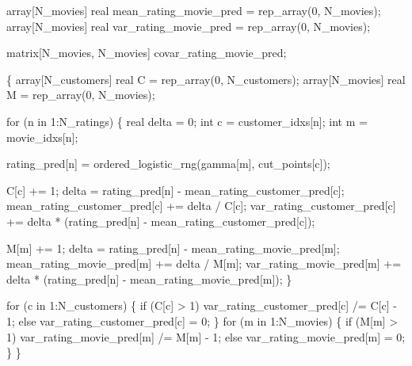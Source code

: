 \documentclass[
  letterpaper,
  DIV=11,
  numbers=noendperiod]{scrartcl}
\newenvironment{Shaded}{\begin{snugshade}}{\end{snugshade}}
\newcommand{\ControlFlowTok}[1]{\textcolor[rgb]{0.00,0.23,0.31}{#1}}
\newcommand{\DataTypeTok}[1]{\textcolor[rgb]{0.68,0.00,0.00}{#1}}
\newcommand{\DecValTok}[1]{\textcolor[rgb]{0.68,0.00,0.00}{#1}}
\newcommand{\NormalTok}[1]{\textcolor[rgb]{0.00,0.23,0.31}{#1}}
\begin{document}
\begin{codelisting}
\begin{Shaded}
\begin{Highlighting}[]
  \DataTypeTok{array}\NormalTok{[N\_movies] }\DataTypeTok{real}\NormalTok{ mean\_rating\_movie\_pred = rep\_array(}\DecValTok{0}\NormalTok{, N\_movies);}
  \DataTypeTok{array}\NormalTok{[N\_movies] }\DataTypeTok{real}\NormalTok{ var\_rating\_movie\_pred = rep\_array(}\DecValTok{0}\NormalTok{, N\_movies);}

  \DataTypeTok{matrix}\NormalTok{[N\_movies, N\_movies] covar\_rating\_movie\_pred;}

\NormalTok{  \{}
    \DataTypeTok{array}\NormalTok{[N\_customers] }\DataTypeTok{real}\NormalTok{ C = rep\_array(}\DecValTok{0}\NormalTok{, N\_customers);}
    \DataTypeTok{array}\NormalTok{[N\_movies] }\DataTypeTok{real}\NormalTok{ M = rep\_array(}\DecValTok{0}\NormalTok{, N\_movies);}

    \ControlFlowTok{for}\NormalTok{ (n }\ControlFlowTok{in} \DecValTok{1}\NormalTok{:N\_ratings) \{}
      \DataTypeTok{real}\NormalTok{ delta = }\DecValTok{0}\NormalTok{;}
      \DataTypeTok{int}\NormalTok{ c = customer\_idxs[n];}
      \DataTypeTok{int}\NormalTok{ m = movie\_idxs[n];}

\NormalTok{      rating\_pred[n] = ordered\_logistic\_rng(gamma[m], cut\_points[c]);}

\NormalTok{      C[c] += }\DecValTok{1}\NormalTok{;}
\NormalTok{      delta = rating\_pred[n] {-} mean\_rating\_customer\_pred[c];}
\NormalTok{      mean\_rating\_customer\_pred[c] += delta / C[c];}
\NormalTok{      var\_rating\_customer\_pred[c]}
\NormalTok{        += delta * (rating\_pred[n] {-} mean\_rating\_customer\_pred[c]);}

\NormalTok{      M[m] += }\DecValTok{1}\NormalTok{;}
\NormalTok{      delta = rating\_pred[n] {-} mean\_rating\_movie\_pred[m];}
\NormalTok{      mean\_rating\_movie\_pred[m] += delta / M[m];}
\NormalTok{      var\_rating\_movie\_pred[m]}
\NormalTok{        += delta * (rating\_pred[n] {-} mean\_rating\_movie\_pred[m]);}
\NormalTok{    \}}

    \ControlFlowTok{for}\NormalTok{ (c }\ControlFlowTok{in} \DecValTok{1}\NormalTok{:N\_customers) \{}
      \ControlFlowTok{if}\NormalTok{ (C[c] \textgreater{} }\DecValTok{1}\NormalTok{)}
\NormalTok{        var\_rating\_customer\_pred[c] /= C[c] {-} }\DecValTok{1}\NormalTok{;}
      \ControlFlowTok{else}
\NormalTok{        var\_rating\_customer\_pred[c] = }\DecValTok{0}\NormalTok{;}
\NormalTok{    \}}
    \ControlFlowTok{for}\NormalTok{ (m }\ControlFlowTok{in} \DecValTok{1}\NormalTok{:N\_movies) \{}
      \ControlFlowTok{if}\NormalTok{ (M[m] \textgreater{} }\DecValTok{1}\NormalTok{)}
\NormalTok{        var\_rating\_movie\_pred[m] /= M[m] {-} }\DecValTok{1}\NormalTok{;}
      \ControlFlowTok{else}
\NormalTok{        var\_rating\_movie\_pred[m] = }\DecValTok{0}\NormalTok{;}
\NormalTok{    \}}
\NormalTok{  \}}


\end{Highlighting}
\end{Shaded}
\end{codelisting}
\end{document}
